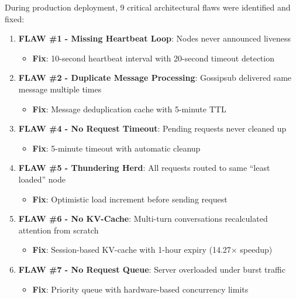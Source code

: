 \documentclass[11pt,a4paper]{article}
\begin{document}
During production deployment, 9 critical architectural flaws were identified and fixed:

\begin{enumerate}[leftmargin=*]
    \item \textbf{FLAW \#1 - Missing Heartbeat Loop}: Nodes never announced liveness
        \begin{itemize}
            \item \textbf{Fix}: 10-second heartbeat interval with 20-second timeout detection
        \end{itemize}

    \item \textbf{FLAW \#2 - Duplicate Message Processing}: Gossipsub delivered same message multiple times
        \begin{itemize}
            \item \textbf{Fix}: Message deduplication cache with 5-minute TTL
        \end{itemize}

    \item \textbf{FLAW \#4 - No Request Timeout}: Pending requests never cleaned up
        \begin{itemize}
            \item \textbf{Fix}: 5-minute timeout with automatic cleanup
        \end{itemize}

    \item \textbf{FLAW \#5 - Thundering Herd}: All requests routed to same ``least loaded'' node
        \begin{itemize}
            \item \textbf{Fix}: Optimistic load increment before sending request
        \end{itemize}

    \item \textbf{FLAW \#6 - No KV-Cache}: Multi-turn conversations recalculated attention from scratch
        \begin{itemize}
            \item \textbf{Fix}: Session-based KV-cache with 1-hour expiry (14.27$\times$ speedup)
        \end{itemize}

    \item \textbf{FLAW \#7 - No Request Queue}: Server overloaded under burst traffic
        \begin{itemize}
            \item \textbf{Fix}: Priority queue with hardware-based concurrency limits
        \end{itemize}


\end{enumerate}
\end{document}
